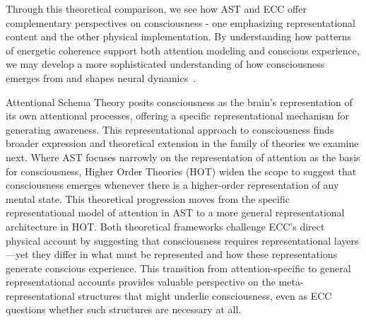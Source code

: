 Through this theoretical comparison, we see how AST and ECC offer complementary perspectives on consciousness - one emphasizing representational content and the other physical implementation. By understanding how patterns of energetic coherence support both attention modeling and conscious experience, we may develop a more sophisticated understanding of how consciousness emerges from and shapes neural dynamics~\cite{Graziano2019, Seth2021}.

Attentional Schema Theory posits consciousness as the brain's representation of its own attentional processes, offering a specific representational mechanism for generating awareness. This representational approach to consciousness finds broader expression and theoretical extension in the family of theories we examine next. Where AST focuses narrowly on the representation of attention as the basis for consciousness, Higher Order Theories (HOT) widen the scope to suggest that consciousness emerges whenever there is a higher-order representation of any mental state. This theoretical progression moves from the specific representational model of attention in AST to a more general representational architecture in HOT. Both theoretical frameworks challenge ECC's direct physical account by suggesting that consciousness requires representational layers—yet they differ in what must be represented and how these representations generate conscious experience. This transition from attention-specific to general representational accounts provides valuable perspective on the meta-representational structures that might underlie consciousness, even as ECC questions whether such structures are necessary at all.

